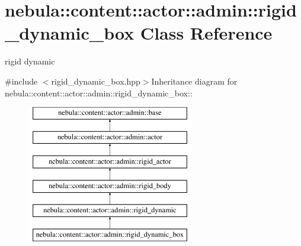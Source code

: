 \hypertarget{classnebula_1_1content_1_1actor_1_1admin_1_1rigid__dynamic__box}{
\section{nebula::content::actor::admin::rigid\_\-dynamic\_\-box Class Reference}
\label{classnebula_1_1content_1_1actor_1_1admin_1_1rigid__dynamic__box}
}


rigid dynamic  


{\ttfamily \#include $<$rigid\_\-dynamic\_\-box.hpp$>$}Inheritance diagram for nebula::content::actor::admin::rigid\_\-dynamic\_\-box::\begin{figure}[H]
\begin{center}
\leavevmode
\includegraphics[height=6cm]{classnebula_1_1content_1_1actor_1_1admin_1_1rigid__dynamic__box}
\end{center}
\end{figure}
